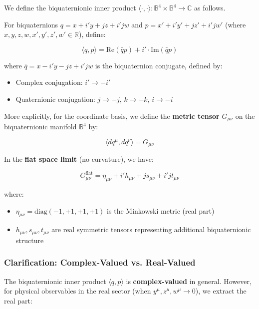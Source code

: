 We define the biquaternionic inner product $\langle \cdot, \cdot \rangle: \mathbb{B}^4 \times \mathbb{B}^4 \to \mathbb{C}$ as follows.

For biquaternions $q = x + i'y + jz + i'jw$ and $p = x' + i'y' + jz' + i'jw'$ (where $x, y, z, w, x', y', z', w' \in \mathbb{R}$), define:

\begin{equation}
\langle q, p \rangle = \text{Re}(\bar{q} p) + i' \cdot \text{Im}(\bar{q} p)
\end{equation}

where $\bar{q} = x - i'y - jz + i'jw$ is the biquaternion conjugate, defined by:
\begin{itemize}
\item Complex conjugation: $i' \to -i'$
\item Quaternionic conjugation: $j \to -j$, $k \to -k$, $i \to -i$
\end{itemize}

More explicitly, for the coordinate basis, we define the \textbf{metric tensor} $G_{\mu\nu}$ on the biquaternionic manifold $\mathbb{B}^4$ by:

\begin{equation}
\langle dq^{\mu}, dq^{\nu} \rangle = G_{\mu\nu}
\end{equation}

In the \textbf{flat space limit} (no curvature), we have:

\begin{equation}
G_{\mu\nu}^{\text{flat}} = \eta_{\mu\nu} + i' h_{\mu\nu} + j s_{\mu\nu} + i'j t_{\mu\nu}
\label{eq:biquaternion_metric_flat}
\end{equation}

where:
\begin{itemize}
\item $\eta_{\mu\nu} = \text{diag}(-1, +1, +1, +1)$ is the Minkowski metric (real part)
\item $h_{\mu\nu}, s_{\mu\nu}, t_{\mu\nu}$ are real symmetric tensors representing additional biquaternionic structure
\end{itemize}

\subsubsection{Clarification: Complex-Valued vs. Real-Valued}

The biquaternionic inner product $\langle q, p \rangle$ is \textbf{complex-valued} in general. However, for physical observables in the real sector (when $y^{\mu}, z^{\mu}, w^{\mu} \to 0$), we extract the real part:

